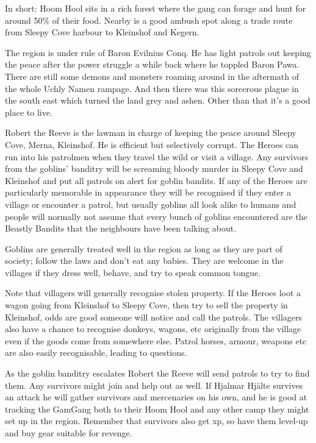 In short: Hoom Hool sits in a rich forest where the gang can forage and hunt for around 50\% of their food. Nearby is a good ambush spot along a trade route from Sleepy Cove harbour to Kleinshof and Kegern.

The region is under rule of Baron Evilnius Conq. He has light patrols out keeping the peace after the power struggle a while back where he toppled Baron Pawa. There are still some demons and monsters roaming around in the aftermath of the whole Uchly Namen rampage. And then there was this sorcerous plague in the south east which turned the land grey and ashen. Other than that it's a good place to live.

Robert the Reeve is the lawman in charge of keeping the peace around Sleepy Cove, Merna, Kleinshof. He is efficient but selectively corrupt. The Heroes can run into his patrolmen when they travel the wild or visit a village. Any survivors from the goblins' banditry will be screaming bloody murder in Sleepy Cove and Kleinshof and put all patrols on alert for goblin bandits. If any of the Heroes are particularly memorable in appearance they will be recognised if they enter a village or encounter a patrol, but usually goblins all look alike to humans and people will normally not assume that every bunch of goblins encountered are the Beastly Bandits that the neighbours have been talking about.

Goblins are generally treated well in the region as long as they are part of society; follow the laws and don't eat any babies. They are welcome in the villages if they dress well, behave, and try to speak common tongue.

Note that villagers will generally recognise stolen property. If the Heroes loot a wagon going from Kleinshof to Sleepy Cove, then try to sell the property in Kleinshof, odds are good someone will notice and call the patrols. The villagers also have a chance to recognise donkeys, wagons, etc originally from the village even if the goods come from somewhere else. Patrol horses, armour, weapons etc are also easily recognisable, leading to questions.

As the goblin banditry escalates Robert the Reeve will send patrols to try to find them. Any survivors might join and help out as well. If Hjalmar Hjälte survives an attack he will gather survivors and mercenaries on his own, and he is good at tracking the GamGang both to their Hoom Hool and any other camp they might set up in the region. Remember that survivors also get xp, so have them level-up and buy gear suitable for revenge.

